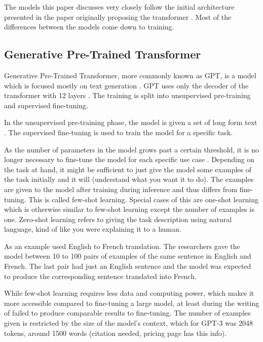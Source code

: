 \documentclass[twoside]{article}
\begin{document}
The models this paper discusses very closely follow the initial architecture
presented in the paper originally proposing the transformer 
\cite{vaswani_attention_2017}. Most of the differences between 
the models come down to training.

\subsection{Generative Pre-Trained Transformer}
Generative Pre-Trained Transformer, more commonly known as GPT, is a model
which is focused mostly on text generation \cite{brown_language_2020}. 
GPT uses only the decoder of the transformer with 12 layers 
\cite{radford_improving_nodate}. The training is split into unsupervised
pre-training and supervised fine-tuning. 

In the unsupervised pre-training phase, the model is given a set of long form text
\cite{radford_improving_nodate}. The supervised fine-tuning is used to train the
model for a specific task. 

As the number of parameters in the model grows past a certain threshold, it
is no longer necessary to fine-tune the model for each specific use case 
\cite{brown_language_2020}. Depending on the task at hand, it might be sufficient
to just give the model some examples of the task initially and it will (understand what you want it to do). The examples are given to
the model after training during inference and thus differs from fine-tuning. 
This is called few-shot learning. Special cases of this are one-shot learning which is
otherwise similar to few-shot learning except the number of examples is one.
Zero-shot learning refers to giving the task description using natural language,
kind of like you were explaining it to a human. 

As an example \cite{brown_language_2020} used English to French translation.
The researchers gave the model between 10 to 100 pairs of examples of the
same sentence in English and French. The last pair had just an English sentence
and the model was expected to produce the corresponding sentence translated into
French.

While few-shot learning requires less data and computing power, which makes it more
accessible compared to fine-tuning a large model, at least during the writing of 
\cite{brown_language_2020} failed to produce comparable results to fine-tuning.
The number of examples given is restricted by the size of the model's context,
which for GPT-3 was 2048 tokens, around 1500 words (citation needed, pricing page has this info).
\end{document}
